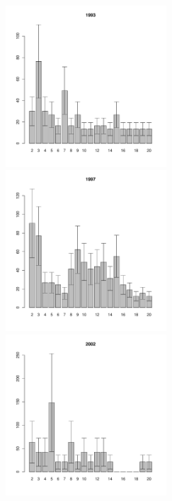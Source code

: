 \begin{figure}[hp]
\begin{minipage}[b]{.3\linewidth}
\begin{center}
	\end{center}
	\end{minipage}
	\begin{minipage}[b]{.3\linewidth}
	\begin{center}
	\includegraphics[width=60mm]{../White_Sea/Luvenga_II_razrez/low_beatch2_1993_.pdf}
	\end{center}
	\end{minipage}
	\hfil %
	\begin{minipage}[b]{.3\linewidth}
	\begin{center}
	\includegraphics[width=60mm]{../White_Sea/Luvenga_II_razrez/low_beatch2_1997_.pdf}
	\end{center}
	\end{minipage}
	\hfil %
	\begin{minipage}[b]{.3\linewidth}
	\begin{center}
	\includegraphics[width=60mm]{../White_Sea/Luvenga_II_razrez/low_beatch2_2002_.pdf}
	\end{center}
	\end{minipage}



\end{figure}

